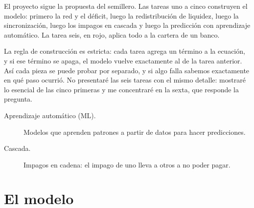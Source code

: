\begin{decir}
El proyecto sigue la propuesta del semillero. Las tareas uno a cinco construyen el
modelo: primero la red y el déficit, luego la redistribución de liquidez, luego la
sincronización, luego los impagos en cascada y luego la predicción con aprendizaje
automático. La tarea seis, en rojo, aplica todo a la cartera de un banco.

La regla de construcción es estricta: cada tarea agrega un término a la ecuación, y si
ese término se apaga, el modelo vuelve exactamente al de la tarea anterior. Así cada
pieza se puede probar por separado, y si algo falla sabemos exactamente en qué paso
ocurrió. No presentaré las seis tareas con el mismo detalle: mostraré lo esencial de las
cinco primeras y me concentraré en la sexta, que responde la pregunta.
\end{decir}
\begin{terminos}
\begin{description}
\item[Aprendizaje automático (ML).] Modelos que aprenden patrones a partir de datos para
hacer predicciones.
\item[Cascada.] Impagos en cadena: el impago de uno lleva a otros a no poder pagar.
\end{description}
\end{terminos}

\section{El modelo}


